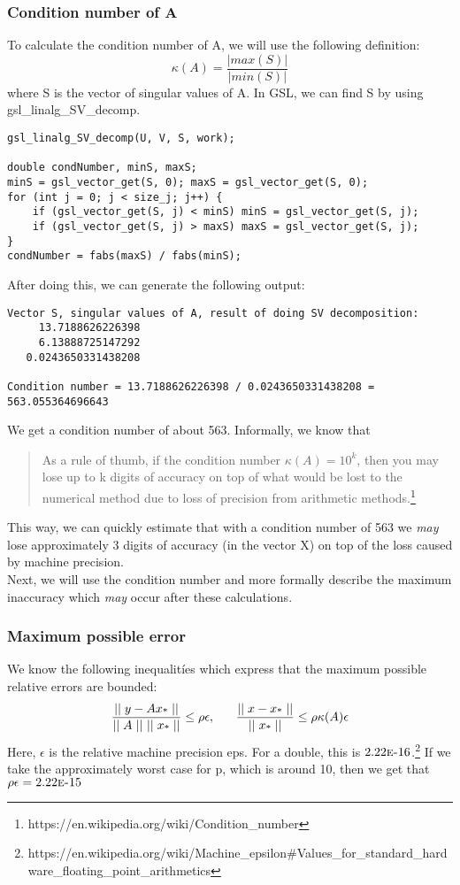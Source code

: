 \documentclass[11pt, a4paper, titlepage, openright]{article}
\begin{document}
    \subsubsection{Condition number of A}
    To calculate the condition number of A, we will use the following definition: \[\kappa(A)= \frac{|max(S)|}{|min(S)|} \]
    where S is the vector of singular values of A. In GSL, we can find S by using gsl\_linalg\_SV\_decomp.
\begin{lstlisting}
gsl_linalg_SV_decomp(U, V, S, work);

double condNumber, minS, maxS;
minS = gsl_vector_get(S, 0); maxS = gsl_vector_get(S, 0);
for (int j = 0; j < size_j; j++) {
    if (gsl_vector_get(S, j) < minS) minS = gsl_vector_get(S, j);
    if (gsl_vector_get(S, j) > maxS) maxS = gsl_vector_get(S, j);
}
condNumber = fabs(maxS) / fabs(minS);
\end{lstlisting}
    After doing this, we can generate the following output:
\begin{lstlisting}
Vector S, singular values of A, result of doing SV decomposition:
     13.7188626226398
     6.13888725147292
   0.0243650331438208

Condition number = 13.7188626226398 / 0.0243650331438208 = 563.055364696643
\end{lstlisting}
    We get a condition number of about 563. Informally, we know that
    \begin{quotation}
    As a rule of thumb, if the condition number  \(\kappa(A) = 10^k\), 
    then you may lose up to k digits of accuracy on top of what 
    would be lost to the numerical method due to loss of precision 
    from arithmetic methods.\footnote{https://en.wikipedia.org/wiki/Condition\_number}
    \end{quotation}
    This way, we can quickly estimate that with a condition number of 563 we \emph{may} lose approximately 
    3 digits of accuracy (in the vector X) on top of the loss caused by machine precision.\\
    
    Next, we will use the condition number and more formally describe the maximum inaccuracy 
    which \emph{may} occur after these calculations.
    
    \subsubsection{Maximum possible error}
    We know the following inequalitíes which express that the maximum possible relative errors are bounded:
    \[\frac{\mid\mid y - Ax\textsubscript{*} \mid\mid}{\mid\mid A \mid\mid \ \mid\mid x\textsubscript{*}\mid\mid} \leq \rho \epsilon,\ \ \ \ \ 
    \frac{\mid\mid x - x\textsubscript{*} \mid\mid}{\mid\mid x\textsubscript{*} \mid\mid} \leq \rho \kappa(A) \epsilon \]
    Here, \(\epsilon\) is the relative machine precision eps. For a double, 
    this is \(2.22\mbox{\sc{e}-}16 \).\footnote{https://en.wikipedia.org/wiki/Machine\_epsilon\#Values\_for\_standard\_hardware\_floating\_point\_arithmetics}
    If we take the approximately worst case for p, which is around 10, then we get that \(\rho \epsilon = 2.22\mbox{\sc{e}-}15 \)
\end{document}
